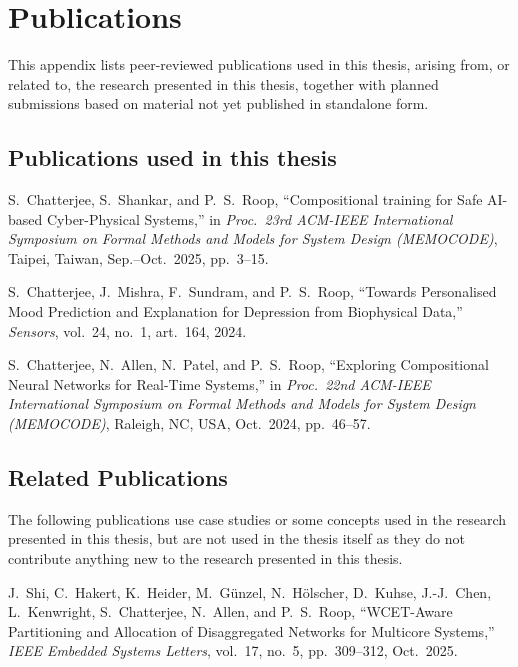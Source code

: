 \chapter{Publications}
\label{chapter:appendix_publications}
\glsresetall

This appendix lists peer-reviewed publications used in this thesis, arising from, or related to, the research presented in this thesis, together with planned submissions based on material not yet published in standalone form. 

\section{Publications used in this thesis}
\begin{enumerate}[label={[\arabic*]}, leftmargin=*, itemsep=0.75em]

\item S.~Chatterjee, S.~Shankar, and P.~S.~Roop, ``Compositional training for Safe AI-based Cyber-Physical Systems,'' in \emph{Proc.\ 23rd ACM-IEEE International Symposium on Formal Methods and Models for System Design (MEMOCODE)}, Taipei, Taiwan, Sep.--Oct.\ 2025, pp.~3--15.

\item S.~Chatterjee, J.~Mishra, F.~Sundram, and P.~S.~Roop, ``Towards Personalised Mood Prediction and Explanation for Depression from Biophysical Data,'' \emph{Sensors}, vol.~24, no.~1, art.\ 164, 2024. 
\item S.~Chatterjee, N.~Allen, N.~Patel, and P.~S.~Roop, ``Exploring Compositional Neural Networks for Real-Time Systems,'' in \emph{Proc.\ 22nd ACM-IEEE International Symposium on Formal Methods and Models for System Design (MEMOCODE)}, Raleigh, NC, USA, Oct.\ 2024, pp.~46--57.

\end{enumerate}



\section{Related Publications}
The following publications use case studies or some concepts used in the research presented in this thesis, but are not used in the thesis itself as they do not contribute anything new to the research presented in this thesis.

\begin{enumerate}[label={[\arabic*]}, leftmargin=*, itemsep=0.75em]

\item J.~Shi, C.~Hakert, K.~Heider, M.~G\"{u}nzel, N.~H\"{o}lscher, D.~Kuhse, J.-J.~Chen, L.~Kenwright, S.~Chatterjee, N.~Allen, and P.~S.~Roop, ``WCET-Aware Partitioning and Allocation of Disaggregated Networks for Multicore Systems,'' \emph{IEEE Embedded Systems Letters}, vol.~17, no.~5, pp.~309--312, Oct.\ 2025. 

\end{enumerate}



